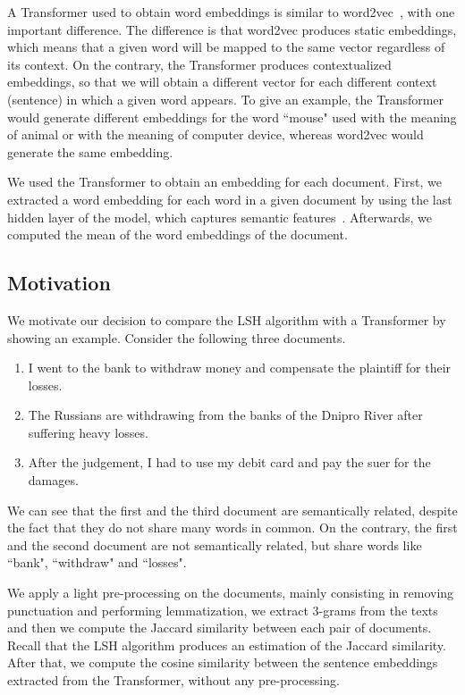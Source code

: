 \documentclass[runningheads]{llncs}
\begin{document}
A Transformer used to obtain word embeddings is similar to word2vec~\cite{mikolov-etal-2013-word2vec}, with one important difference. The difference is that word2vec produces static embeddings, which means that a given word will be mapped to the same vector regardless of its context. On the contrary, the Transformer produces contextualized embeddings, so that we will obtain a different vector for each different context (sentence) in which a given word appears. To give an example, the Transformer would generate different embeddings for the word “mouse" used with the meaning of animal or with the meaning of computer device, whereas word2vec would generate the same embedding.

We used the Transformer to obtain an embedding for each document. First, we extracted a word embedding for each word in a given document by using the last hidden layer of the model, which captures semantic features~\cite{laicher-etal-2021-explaining}. Afterwards, we computed the mean of the word embeddings of the document.

\subsection{Motivation}
\label{subsec:models:motivation}

We motivate our decision to compare the LSH algorithm with a Transformer by showing an example. Consider the following three documents.
\begin{enumerate}
  \item I went to the bank to withdraw money and compensate the plaintiff for their losses.
  \item The Russians are withdrawing from the banks of the Dnipro River after suffering heavy losses.
  \item After the judgement, I had to use my debit card and pay the suer for the damages.
\end{enumerate}
We can see that the first and the third document are semantically related, despite the fact that they do not share many words in common. On the contrary, the first and the second document are not semantically related, but share words like “bank", “withdraw" and “losses".

We apply a light pre-processing on the documents, mainly consisting in removing punctuation and performing lemmatization, we extract 3-grams from the texts and then we compute the Jaccard similarity between each pair of documents. Recall that the LSH algorithm produces an estimation of the Jaccard similarity. After that, we compute the cosine similarity between the sentence embeddings extracted from the Transformer, without any pre-processing.
\end{document}
